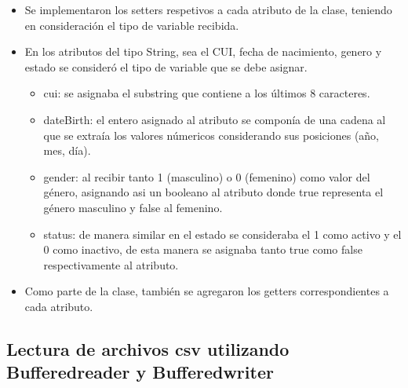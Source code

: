 \documentclass{article}
\begin{document}
    

    \begin{itemize}	
		\item Se implementaron los setters respetivos a cada atributo de la clase, teniendo en consideración el tipo de variable recibida.
        \item En los atributos del tipo String, sea el CUI, fecha de nacimiento, genero y estado se consideró el tipo de variable que se debe asignar.
        \begin{itemize}
            \item cui: se asignaba el substring que contiene a los últimos 8 caracteres.
            \item dateBirth: el entero asignado al atributo se componía de una cadena al que se extraía los valores númericos considerando sus posiciones (año, mes, día).
            \item gender: al recibir tanto 1 (masculino) o 0 (femenino) como valor del género, asignando asi un booleano al atributo donde true representa el género masculino y false al femenino.
            \item status: de manera similar en el estado se consideraba el 1 como activo y el 0 como inactivo, de esta manera se asignaba tanto true como false respectivamente al atributo.
        \end{itemize}
	\end{itemize}

    

    
    \begin{itemize}	
		\item Como parte de la clase, también se agregaron los getters correspondientes a cada atributo.
	\end{itemize}

    



    \subsection{Lectura de archivos csv utilizando Bufferedreader y Bufferedwriter}
	
\end{document}
